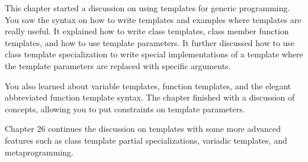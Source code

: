 This chapter started a discussion on using templates for generic programming. You saw the syntax on how to write templates and examples where templates are really useful. It explained how to write class templates, class member function templates, and how to use template parameters. It further discussed how to use class template specialization to write special implementations of a template where the template parameters are replaced with specific arguments.

You also learned about variable templates, function templates, and the elegant abbreviated function template syntax. The chapter finished with a discussion of concepts, allowing you to put constraints on template parameters.

Chapter 26 continues the discussion on templates with some more advanced features such as class template partial specializations, variadic templates, and metaprogramming.